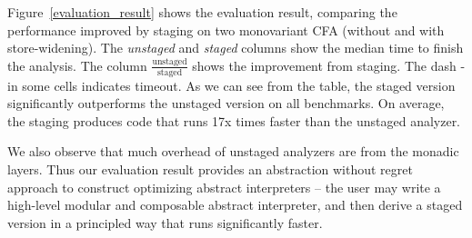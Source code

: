 Figure~\ref{evaluation_result} shows the evaluation result, comparing the
performance improved by staging on two monovariant CFA (without and with store-widening). The
\textit{unstaged} and \textit{staged} columns show the median time to finish the
analysis. The column $\frac{\text{unstaged}}{\text{staged}}$
shows the improvement from staging. The dash - in some cells indicates timeout.
As we can see from the table, the staged version significantly outperforms the
unstaged version on all benchmarks.
On average, the staging produces code that runs 17x times faster
than the unstaged analyzer.

We also observe that much overhead of unstaged analyzers are from the monadic
layers. Thus our evaluation result provides an abstraction without regret
approach to construct optimizing abstract interpreters -- the user may write a
high-level modular and composable abstract interpreter, and then derive a staged
version in a principled way that runs significantly faster.
